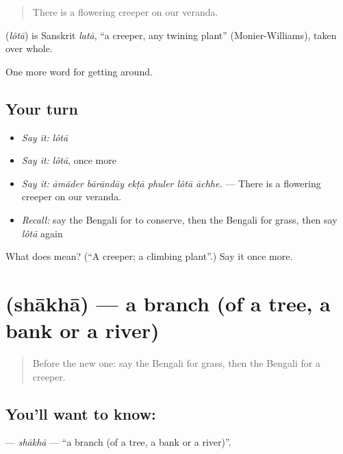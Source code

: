 \begin{quote}
There is a flowering creeper on our veranda.
\end{quote}

\begin{cousinweb}
\textbf{} (\emph{lôtā}) is Sanskrit \emph{latā}, \textquotedblleft{}a creeper, any twining plant\textquotedblright{} (Monier-Williams), taken over whole.
\end{cousinweb}

\begin{grammarlens}[title={What you've built}]
One more word for getting around.
\end{grammarlens}

\subsection*{Your turn}
\begin{itemize}
\raggedright
  \item \emph{Say it:} \emph{lôtā}
  \item \emph{Say it:} \emph{lôtā}, once more
  \item \emph{Say it:} \emph{āmāder bārāndāy ekṭā phuler lôtā āchhe.} — There is a flowering creeper on our veranda.
  \item \emph{Recall:} say the Bengali for to conserve, then the Bengali for grass, then say \emph{lôtā} again
\end{itemize}

\begin{tcolorbox}[breakable,colback=teal!4,colframe=teal!35!black,title={Before you move on}]
What does  mean? (\textquotedblleft{}A creeper; a climbing plant\textquotedblright{}.) Say it once more.
\end{tcolorbox}
\section[\texorpdfstring{\bn{শাখা} (shākhā)}{শাখা (shākhā)}]{ (shākhā) — a branch (of a tree, a bank or a river)}

\label{lesson:BN-C435-shakha}



\begin{quote}
Before the new one: say the Bengali for grass, then the Bengali for a creeper.
\end{quote}

\subsection*{You'll want to know: }
\textbf{} — \emph{shākhā} — \textquotedblleft{}a branch (of a tree, a bank or a river)\textquotedblright{}.

